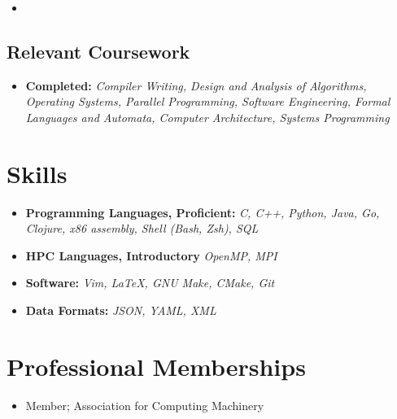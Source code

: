 \documentclass[10pt,letterpaper,sans]{moderncv}
\begin{document}
\vspace{2pt}

\begin{itemize}

    \item{
    }

\end{itemize}

\subsection{Relevant Coursework}

\vspace{2pt}

\begin{itemize}
    \item{
        \textbf{Completed:}
        \textit{
            Compiler Writing, Design and Analysis of Algorithms, Operating
            Systems, Parallel Programming, Software Engineering, Formal
            Languages and Automata, Computer Architecture, Systems Programming
        }
    }

\end{itemize}

\section{Skills}

\vspace{3pt}

\begin{itemize}

    \item{
        \textbf{Programming Languages, Proficient:}
        \textit{
            C, C++, Python, Java, Go, Clojure, x86 assembly, Shell (Bash, Zsh),
            SQL
        }
    }
    \vspace{3pt}
    \item{
        \textbf{HPC Languages, Introductory}
        \textit{
            OpenMP, MPI
        }
    }
    \item{
        \textbf{Software:}
        \textit{
            Vim, \LaTeX, GNU Make, CMake, Git
        }
    }
    \item {
        \textbf{Data Formats:}
        \textit{
            JSON, YAML, XML
        }
    }
\end{itemize}

\section{Professional Memberships}
\begin{itemize}
    \item {
            Member; Association for Computing Machinery
    }
\end{itemize}
\end{document}
